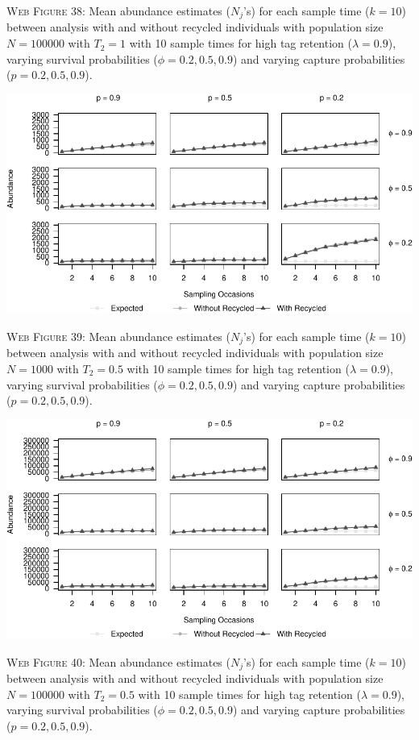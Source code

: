 \documentclass[]{article}
\begin{document}
\textsc{Web Figure 38:} Mean abundance estimates (\(N_j\)'s) for each
sample time (\(k=10\)) between analysis with and without recycled
individuals with population size \(N=100000\) with \(T_2=1\) with 10
sample times for high tag retention (\(\lambda=0.9\)), varying survival
probabilities (\(\phi=0.2,0.5,0.9\)) and varying capture probabilities
(\(p=0.2,0.5,0.9\)).

\newpage

\includegraphics{Appendix_BW_files/figure-latex/39_abundance_H_GJSTL4-1.pdf}

\textsc{Web Figure 39:} Mean abundance estimates (\(N_j\)'s) for each
sample time (\(k=10\)) between analysis with and without recycled
individuals with population size \(N=1000\) with \(T_2=0.5\) with 10
sample times for high tag retention (\(\lambda=0.9\)), varying survival
probabilities (\(\phi=0.2,0.5,0.9\)) and varying capture probabilities
(\(p=0.2,0.5,0.9\)).

\includegraphics{Appendix_BW_files/figure-latex/40_abundance_H_GJSTL3-1.pdf}

\textsc{Web Figure 40:} Mean abundance estimates (\(N_j\)'s) for each
sample time (\(k=10\)) between analysis with and without recycled
individuals with population size \(N=100000\) with \(T_2=0.5\) with 10
sample times for high tag retention (\(\lambda=0.9\)), varying survival
probabilities (\(\phi=0.2,0.5,0.9\)) and varying capture probabilities
(\(p=0.2,0.5,0.9\)).
\end{document}
